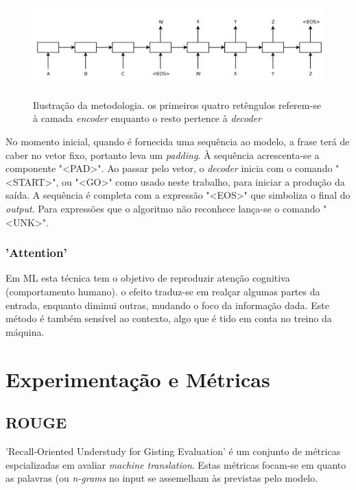 \documentclass{article}
\begin{document}
\begin{figure}[h]
    \centering
    \includegraphics[scale=0.3]{encoder_decoder.png}
    \caption{Ilustração da metodologia. os primeiros quatro retêngulos referem-se à camada \textit{encoder} enquanto o resto pertence à \textit{decoder}}
    \cite{sutskever2014sequence}
    \label{fig1}
\end{figure}


No momento inicial, quando é fornecida uma sequência ao modelo, a frase terá de caber no vetor fixo, portanto leva um \textit{padding}. À sequência acrescenta-se a componente "\textless PAD\textgreater ". Ao passar pelo vetor, o \textit{decoder} inicia com o comando "\textless START\textgreater ", ou "\textless GO\textgreater " como usado neste trabalho, para iniciar a produção da saída. A sequência é completa com a expressão "\textless EOS\textgreater " que simboliza o final do \textit{output}. Para expressões que o algoritmo não reconhece lança-se o comando "\textless UNK\textgreater ".

\subsubsection{'Attention'}
Em ML esta técnica tem o objetivo de reproduzir atenção cognitiva (comportamento humano). o efeito traduz-se em realçar algumas partes da entrada, enquanto diminui outras, mudando o foco da informação dada. Este método é também sensível ao contexto, algo que é tido em conta no treino da máquina. 


\section{Experimentação e Métricas}

\subsection{ROUGE}
'Recall-Oriented Understudy for Gisting Evaluation' é um conjunto de métricas espcializadas em avaliar \textit{machine translation}. Estas métricas focam-se em quanto as palavras (ou \textit{n-grams} no input se assemelham às previstas pelo modelo.
\end{document}
